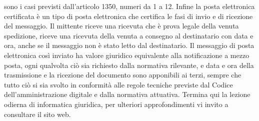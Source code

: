 sono i casi previsti dall'articolo 1350, numeri da 1 a 12. Infine la posta elettronica certificata è un tipo di posta elettronica che certifica le fasi di invio e di ricezione del messaggio. Il mittente riceve una ricevuta che è prova legale della venuta spedizione, riceve una ricevuta della venuta a consegno al destinatario con data e ora, anche se il messaggio non è stato letto dal destinatario. Il messaggio di posta elettronica così inviato ha valore giuridico equivalente alla notificazione a mezzo posta, ogni qualvolta ciò sia richiesto dalla normativa rilevante, e data e ora della trasmissione e la ricezione del documento sono apponibili ai terzi, sempre che tutto ciò si sia svolto in conformità alle regole tecniche previste dal Codice dell'amministrazione digitale e dalla normativa attuativa. Termina qui la lezione odierna di informatica giuridica, per ulteriori approfondimenti vi invito a consultare il sito web.